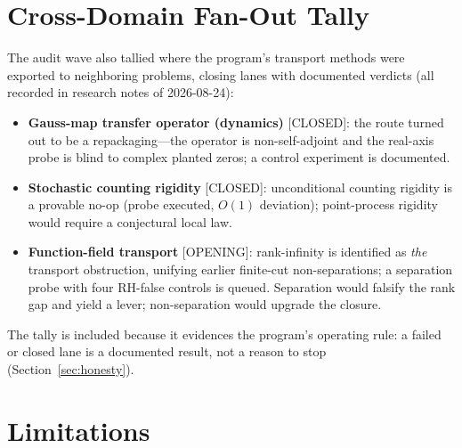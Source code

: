\documentclass[11pt]{article}
\begin{document}
\section{Cross-Domain Fan-Out Tally}
\label{sec:fanout}

The audit wave also tallied where the program's transport methods were exported
to neighboring problems, closing lanes with documented verdicts
(all recorded in research notes of 2026-08-24):
\begin{itemize}
\item \textbf{Gauss-map transfer operator (dynamics)} [CLOSED]: the route
  turned out to be a repackaging---the operator is non-self-adjoint and the
  real-axis probe is blind to complex planted zeros; a control experiment is
  documented.
\item \textbf{Stochastic counting rigidity} [CLOSED]: unconditional counting
  rigidity is a provable no-op (probe executed, $O(1)$ deviation); point-process
  rigidity would require a conjectural local law.
\item \textbf{Function-field transport} [OPENING]: rank-infinity is identified
  as \emph{the} transport obstruction, unifying earlier finite-cut
  non-separations; a separation probe with four RH-false controls is queued.
  Separation would falsify the rank gap and yield a lever; non-separation would
  upgrade the closure.
\end{itemize}
The tally is included because it evidences the program's operating rule: a
failed or closed lane is a documented result, not a reason to stop
(Section~\ref{sec:honesty}).

\section{Limitations}
\label{sec:limits}
\end{document}
